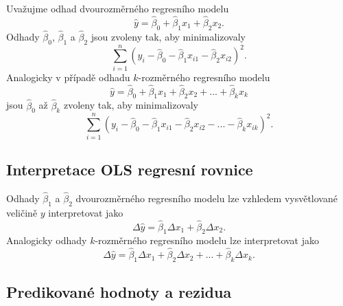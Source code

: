 Uvažujme odhad dvourozměrného regresního modelu
\begin{equation}
\hat{y} = \hat{\beta}_0 + \hat{\beta}_1 x_1 + \hat{\beta}_2 x_2.
\end{equation}
Odhady $\hat{\beta}_0$, $\hat{\beta}_1$ a $\hat{\beta}_2$ jsou zvoleny tak, aby minimalizovaly
\begin{equation}
\sum_{i = 1}^n (y_i - \hat{\beta}_0 - \hat{\beta}_1 x_{i1} - \hat{\beta}_2 x_{i2})^2.
\end{equation}
Analogicky v případě odhadu $k$-rozměrného regresního modelu
\begin{equation}
\hat{y} = \hat{\beta}_0 + \hat{\beta}_1 x_1 + \hat{\beta}_2 x_2 + ... + \hat{\beta}_k x_k
\end{equation}
jsou $\hat{\beta}_0$ až $\hat{\beta}_k$ zvoleny tak, aby minimalizovaly
\begin{equation}
\sum_{i = 1}^n (y_i - \hat{\beta}_0 - \hat{\beta}_1 x_{i1} - \hat{\beta}_2 x_{i2} - ... - \hat{\beta}_k x_{ik})^2.
\end{equation}

\subsection{Interpretace OLS regresní rovnice}

Odhady $\hat{\beta}_1$ a $\hat{\beta}_2$ dvourozměrného regresního modelu lze vzhledem vysvětlované veličině $y$ interpretovat jako 
\begin{equation}
\Delta \hat{y} = \hat{\beta}_1 \Delta x_1 + \hat{\beta}_2 \Delta x_2.
\end{equation}
Analogicky odhady $k$-rozměrného regresního modelu lze interpretovat jako
\begin{equation}
\Delta \hat{y} = \hat{\beta}_1 \Delta x_1 + \hat{\beta}_2 \Delta x_2 + ... + \hat{\beta}_k \Delta x_k.
\end{equation}

\subsection{Predikované hodnoty a rezidua}

